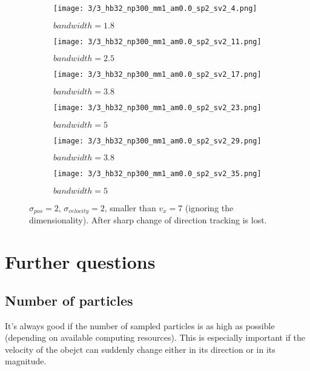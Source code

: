 \documentclass[10pt,a4paper,twoside]{article}
\newcommand{\sweepsize}{0.26}
\begin{document}
\begin{figure}[h]
    \centering
    \begin{subfigure}{\sweepsize\textwidth}
    \texttt{[image: 3/3\_hb32\_np300\_mm1\_am0.0\_sp2\_sv2\_4.png]} 
    \caption{$bandwidth=1.8$}
    \end{subfigure}
    \begin{subfigure}{\sweepsize\textwidth}
    \texttt{[image: 3/3\_hb32\_np300\_mm1\_am0.0\_sp2\_sv2\_11.png]} 
    \caption{$bandwidth=2.5$}
    \end{subfigure}
    \begin{subfigure}{\sweepsize\textwidth}
    \texttt{[image: 3/3\_hb32\_np300\_mm1\_am0.0\_sp2\_sv2\_17.png]} 
    \caption{$bandwidth=3.8$}
    \end{subfigure}
    \begin{subfigure}{\sweepsize\textwidth}
    \texttt{[image: 3/3\_hb32\_np300\_mm1\_am0.0\_sp2\_sv2\_23.png]} 
    \caption{$bandwidth=5$}
    \end{subfigure}
    \begin{subfigure}{\sweepsize\textwidth}
    \texttt{[image: 3/3\_hb32\_np300\_mm1\_am0.0\_sp2\_sv2\_29.png]} 
    \caption{$bandwidth=3.8$}
    \end{subfigure}
    \begin{subfigure}{\sweepsize\textwidth}
    \texttt{[image: 3/3\_hb32\_np300\_mm1\_am0.0\_sp2\_sv2\_35.png]} 
    \caption{$bandwidth=5$}
    \end{subfigure}
    \caption{$\sigma_{pos}=2$, $\sigma_{velocity}=2$, smaller than $v_x=7$ (ignoring the dimensionality). After sharp change of direction tracking is lost.}

\end{figure}

\section{Further questions}
\subsection{Number of particles}

It's always good if the number of sampled particles is as high as possible
(depending on available computing resources). This is especially important if
the velocity of the obejct can suddenly change either in its direction or in its
magnitude.
\end{document}
